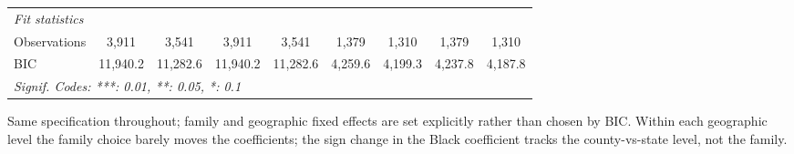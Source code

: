 \begin{table}[htbp]
\begin{tabular}{lcccccccc}
      \midrule
      \emph{Fit statistics}\\
      Observations    & 3,911           & 3,541           & 3,911           & 3,541           & 1,379           & 1,310           & 1,379           & 1,310\\  
      BIC             & 11,940.2        & 11,282.6        & 11,940.2        & 11,282.6        & 4,259.6         & 4,199.3         & 4,237.8         & 4,187.8\\  
      \midrule \midrule
      \multicolumn{9}{l}{\emph{Signif. Codes: ***: 0.01, **: 0.05, *: 0.1}}\\
   \end{tabular}
   
   \par \raggedright 
   Same specification throughout; family and geographic fixed effects are set explicitly rather than chosen by BIC. Within each geographic level the family choice barely moves the coefficients; the sign change in the Black coefficient tracks the county-vs-state level, not the family.
\end{table}


